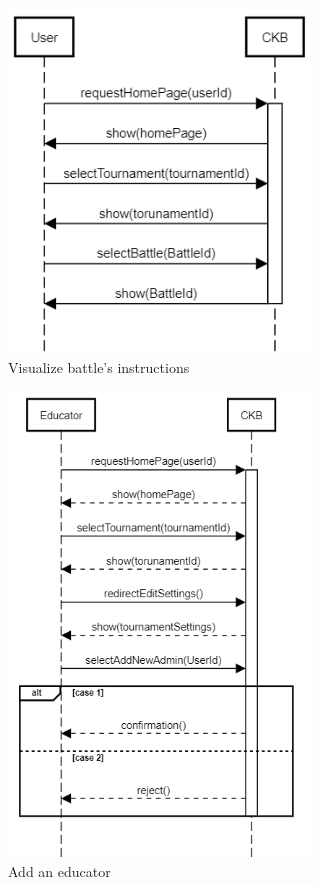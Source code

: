 \documentclass{article}
\begin{document}
\begin{figure}[!ht]
    \centering
    \includegraphics[width=8cm]{LaudiziMarusicMassarelli/RASD/VisualizeBattle.png}
    \caption{Visualize battle's instructions}
    \label{fig:Visualize battle's instructions}
\end{figure}

\begin{figure}[!ht]
    \centering
    \includegraphics[width=8cm]{LaudiziMarusicMassarelli/RASD/AddAdmin (1).png}
    \caption{Add an educator}
    \label{fig:Add an educator}
\end{figure}
\end{document}
